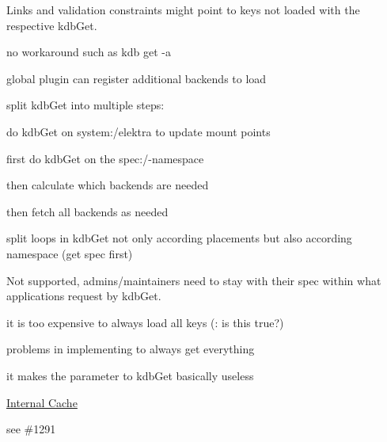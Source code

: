 Links and validation constraints might point to keys not loaded with the respective {\ttfamily kdb\+Get}.


\begin{DoxyItemize}
\item no workaround such as {\ttfamily kdb get -\/a}
\end{DoxyItemize}


\begin{DoxyItemize}
\item global plugin can register additional backends to load
\item split {\ttfamily kdb\+Get} into multiple steps\+:
\begin{DoxyEnumerate}
\item do {\ttfamily kdb\+Get} on {\ttfamily system\+:/elektra} to update mount points
\item first do {\ttfamily kdb\+Get} on the {\ttfamily spec\+:/}-\/namespace
\item then calculate which backends are needed
\item then fetch all backends as needed
\end{DoxyEnumerate}
\item split loops in {\ttfamily kdb\+Get} not only according placements but also according namespace (get spec first)
\end{DoxyItemize}

Not supported, admins/maintainers need to stay with their spec within what applications request by {\ttfamily kdb\+Get}.


\begin{DoxyItemize}
\item it is too expensive to always load all keys (\+: is this true?)
\item problems in implementing to always get everything
\item it makes the parameter to {\ttfamily kdb\+Get} basically useless
\end{DoxyItemize}


\begin{DoxyItemize}
\item \hyperlink{doc_decisions_internal_cache_md}{Internal Cache}
\end{DoxyItemize}

see \#1291 